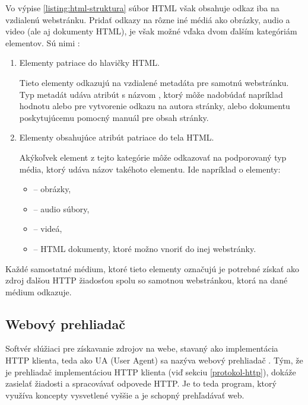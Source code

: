Vo výpise \ref{listing:html-struktura} súbor HTML však obsahuje odkaz iba na vzdialenú webstránku.
Pridať odkazy na rôzne iné médiá ako obrázky, audio a video (ale aj dokumenty HTML), je však možné vďaka dvom ďalším kategóriám elementov. 
Sú nimi \cite{documents-html-spec}: 
\begin{enumerate}
    \item Elementy  patriace do hlavičky HTML.

    Tieto elementy odkazujú na vzdialené metadáta pre samotnú webstránku.
    Typ metadát udáva atribút s názvom , ktorý môže nadobúdať napríklad hodnotu 
     alebo  pre vytvorenie odkazu na autora stránky, alebo dokumentu poskytujúcemu 
    pomocný manuál pre obsah stránky.
    
    \item Elementy obsahujúce atribút  patriace do tela HTML.

    Akýkoľvek element z tejto kategórie môže odkazovať na podporovaný typ média, ktorý udáva názov takéhoto elementu.
    Ide napríklad o elementy: 
    \begin{itemize}
        \item {} -- obrázky,
        \item {} -- audio súbory,
        \item {} -- videá,
        \item {} -- HTML dokumenty, ktoré možno vnoriť do inej webstránky.
    \end{itemize}
    
\end{enumerate}

Každé samostatné médium, ktoré tieto elementy označujú je potrebné získať ako zdroj ďalšou HTTP žiadosťou spolu so samotnou webstránkou, ktorá na dané médium odkazuje.

\subsection{Webový prehliadač}
\label{webovy-prehliadac}


Softvér slúžiaci pre získavanie zdrojov na webe, stavaný ako implementácia HTTP klienta, teda ako UA (User Agent) sa nazýva webový prehliadač \cite{mdn-docs-browser}. 
Tým, že je prehliadač implementáciou HTTP klienta (viď sekciu \ref{protokol-http}), dokáže zasielať žiadosti a spracovávať odpovede HTTP.
Je to teda program, ktorý využíva koncepty vysvetlené vyššie a je schopný prehľadávať web.

